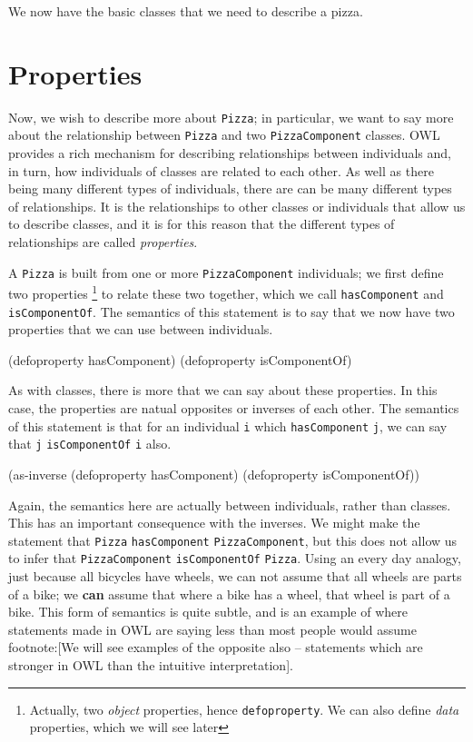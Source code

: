 We now have the basic classes that we need to describe a pizza.


\section{Properties}
\label{sec-5-3}

Now, we wish to describe more about \verb~Pizza~; in particular, we want to say
more about the relationship between \verb~Pizza~ and two \verb~PizzaComponent~ classes.
OWL provides a rich mechanism for describing relationships between individuals
and, in turn, how individuals of classes are related to each other. As well as
there being many different types of individuals, there are can be many
different types of relationships. It is the relationships to other classes or
individuals that allow us to describe classes, and it is for this reason that
the different types of relationships are called \emph{properties}.

A \verb~Pizza~ is built from one or more \verb~PizzaComponent~ individuals; we first
define two properties \footnote{Actually, two \emph{object} properties, hence
\verb~defoproperty~. We can also define \emph{data} properties, which we will see later}
to relate these two together, which we call \verb~hasComponent~ and
\verb~isComponentOf~. The semantics of this statement is to say that we now have
two properties that we can use between individuals.

\begin{tawny}
(defoproperty hasComponent)
(defoproperty isComponentOf)
\end{tawny}

As with classes, there is more that we can say about these properties. In this
case, the properties are natual opposites or inverses of each other. The
semantics of this statement is that for an individual \verb~i~ which \verb~hasComponent~
\verb~j~, we can say that \verb~j~ \verb~isComponentOf~ \verb~i~ also. 

\begin{tawny}
(as-inverse
 (defoproperty hasComponent)
 (defoproperty isComponentOf))
\end{tawny}

Again, the semantics here are actually between individuals, rather than
classes. This has an important consequence with the inverses. We might make
the statement that \verb~Pizza~ \verb~hasComponent~ \verb~PizzaComponent~, but this does not
allow us to infer that \verb~PizzaComponent~ \verb~isComponentOf~ \verb~Pizza~. Using an
every day analogy, just because all bicycles have wheels, we can not assume
that all wheels are parts of a bike; we \textbf{can} assume that where a bike has a
wheel, that wheel is part of a bike. This form of semantics is quite subtle,
and is an example of where statements made in OWL are saying less than most
people would assume footnote:[We will see examples of the opposite also --
statements which are stronger in OWL than the intuitive interpretation].

